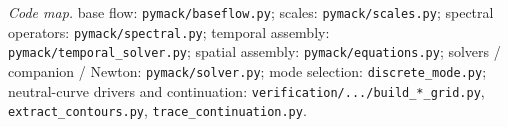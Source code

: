 \documentclass[11pt]{article}
\begin{document}
\bigskip
\noindent\emph{Code map.} base flow: \texttt{pymack/baseflow.py}; scales: \texttt{pymack/scales.py};
spectral operators: \texttt{pymack/spectral.py}; temporal assembly: \texttt{pymack/temporal\_solver.py};
spatial assembly: \texttt{pymack/equations.py}; solvers / companion / Newton: \texttt{pymack/solver.py};
mode selection: \texttt{discrete\_mode.py}; neutral-curve drivers and continuation:
\texttt{verification/.../build\_*\_grid.py}, \texttt{extract\_contours.py}, \texttt{trace\_continuation.py}.
\end{document}

